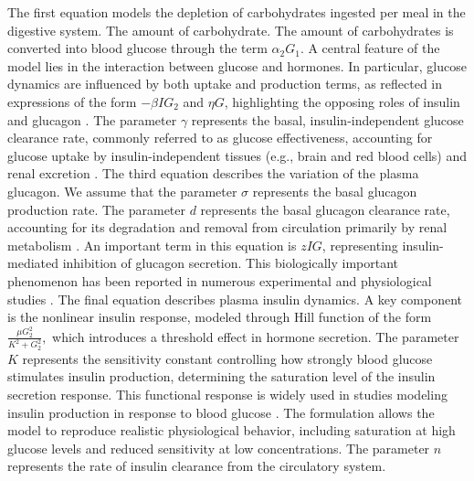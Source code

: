 \documentclass[a4paper,fleqn]{cas-sc}
\numberwithin{equation}{section}
\numberwithin{equation}{section}
\newcommand{\1}{\boldsymbol{1}}
\newcommand{\0}{\boldsymbol{0}}
\begin{document}
The first equation models the depletion of carbohydrates ingested per meal in the digestive system. The amount of carbohydrate. The amount of carbohydrates is converted into blood glucose through the term $\alpha_2 G_1$. A central feature of the model lies in the interaction between glucose and hormones. In particular, glucose dynamics are influenced by both uptake and production terms, as reflected in expressions of the form \( -\beta I G_2 \) and \( \eta G \), highlighting the opposing roles of insulin and glucagon \cite{SaltielKahn2001Insulin,UngerOrci1981Glucagon}. The parameter $\gamma$ represents the basal, insulin-independent glucose clearance rate, commonly referred to as glucose effectiveness, accounting for glucose uptake by insulin-independent tissues (e.g., brain and red blood cells) and renal excretion \cite{Bergman2021MinimalModelHistory}.
The third equation describes the variation of the plasma glucagon. We assume that the parameter $\sigma$ represents the basal glucagon production rate. The parameter $d$  represents the basal glucagon clearance rate, accounting for its degradation and removal from circulation primarily by renal metabolism \cite{Emmanouel1978GlucagonMetabolism}. An important term in this equation is $zIG$, representing insulin-mediated inhibition of glucagon secretion. This biologically important phenomenon has been reported in numerous experimental and physiological studies \cite{Kaneko1999PI3KGlucagon,Kawamori2009InsulinGlucagon,Vergari2019SGLT2Somatostatin}. The final equation describes plasma insulin dynamics. A key component is the nonlinear insulin response, modeled through Hill function of the form \(\frac{\mu G_2^2}{K^2 + G_2^2},\) which introduces a threshold effect in hormone secretion. The parameter $K$ represents the sensitivity constant controlling how strongly blood glucose stimulates insulin production, determining the saturation level of the insulin secretion response. This functional response is widely used in studies modeling insulin production in response to blood glucose \cite{Buchwald2011,Huang2012,Gallenberger2012,DAbbicco2016}. The formulation allows the model to reproduce realistic physiological behavior, including saturation at high glucose levels and reduced sensitivity at low concentrations. The parameter $n$ represents the rate of insulin clearance from the circulatory system.
\end{document}
